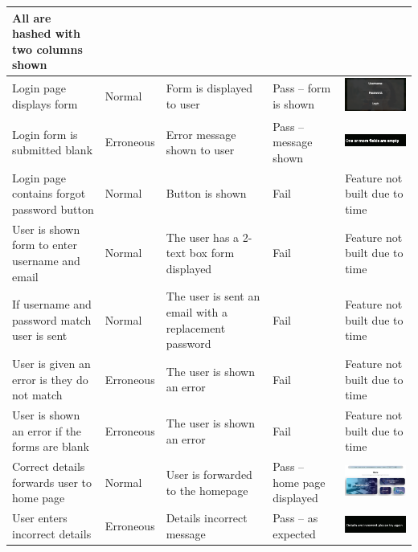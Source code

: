 \begin{center}
\begin{longtable}{|P{17mm}|P{17mm}|P{16mm}|P{17mm}|P{60mm}|}
All are hashed with two columns shown \\ \hline
Login page displays form & Normal & Form is displayed to user & Pass --
form is shown &
\includegraphics[width=58mm]{ch3_developing/proto3/media/image9.png} \\ \hline
Login form is submitted blank & Erroneous & Error message shown to user
& Pass -- message shown &
\includegraphics[width=58mm]{ch3_developing/proto3/media/image10.png} \\ \hline
Login page contains forgot password button & Normal & Button is shown &
Fail & Feature not built due to time \\ \hline
User is shown form to enter username and email & Normal & The user has a
2-text box form displayed & Fail & Feature not built due to time \\ \hline
If username and password match user is sent & Normal & The user is sent
an email with a replacement password & Fail & Feature not built due to
time \\ \hline
User is given an error is they do not match & Erroneous & The user is
shown an error & Fail & Feature not built due to time \\ \hline
User is shown an error if the forms are blank & Erroneous & The user is
shown an error & Fail & Feature not built due to time \\ \hline
Correct details forwards user to home page & Normal & User is forwarded
to the homepage & Pass -- home page displayed &
\includegraphics[width=58mm]{ch3_developing/proto3/media/image11.png} \\ \hline
User enters incorrect details & Erroneous & Details incorrect message &
Pass -- as expected &
\includegraphics[width=58mm]{ch3_developing/proto3/media/image12.png} \\ \hline

\end{longtable}
\end{center}

